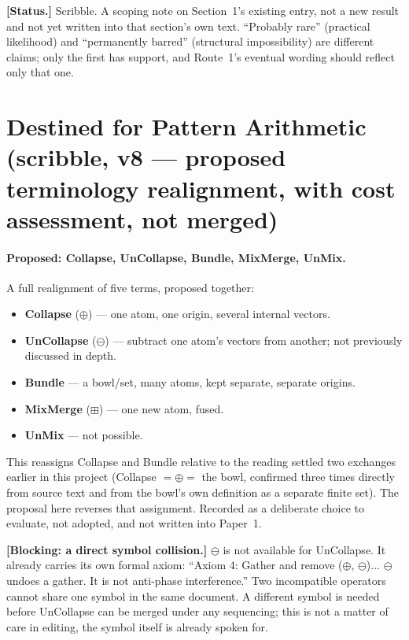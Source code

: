 \documentclass[11pt]{article}
\begin{document}
\textbf{[Status.]} Scribble. A scoping note on Section~1's existing
entry, not a new result and not yet written into that section's own
text. ``Probably rare'' (practical likelihood) and ``permanently
barred'' (structural impossibility) are different claims; only the
first has support, and Route~1's eventual wording should reflect only
that one.

\section{Destined for Pattern Arithmetic (scribble, v8 --- proposed
terminology realignment, with cost assessment, not merged)}

\paragraph{Proposed: Collapse, UnCollapse, Bundle, MixMerge, UnMix.}
A full realignment of five terms, proposed together:
\begin{itemize}
\item \textbf{Collapse} ($\oplus$) --- one atom, one origin, several
      internal vectors.
\item \textbf{UnCollapse} ($\ominus$) --- subtract one atom's vectors
      from another; not previously discussed in depth.
\item \textbf{Bundle} --- a bowl/set, many atoms, kept separate,
      separate origins.
\item \textbf{MixMerge} ($\boxplus$) --- one new atom, fused.
\item \textbf{UnMix} --- not possible.
\end{itemize}
This reassigns Collapse and Bundle relative to the reading settled
two exchanges earlier in this project (Collapse $=\oplus=$ the bowl,
confirmed three times directly from source text and from the bowl's
own definition as a separate finite set). The proposal here reverses
that assignment. Recorded as a deliberate choice to evaluate, not
adopted, and not written into Paper~1.

\textbf{[Blocking: a direct symbol collision.]} $\ominus$ is not
available for UnCollapse. It already carries its own formal axiom:
``Axiom 4: Gather and remove ($\oplus$, $\ominus$)... $\ominus$
undoes a gather. It is not anti-phase interference.'' Two
incompatible operators cannot share one symbol in the same document.
A different symbol is needed before UnCollapse can be merged under
any sequencing; this is not a matter of care in editing, the symbol
itself is already spoken for.
\end{document}

